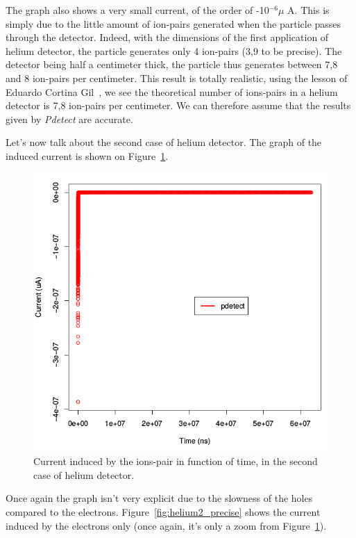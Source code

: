 \documentclass[11pt]{article}
\begin{document}
				The graph also shows a very small current, of the order of -10$^{-6}\mu$ A. This is simply due to the little
				amount of ion-pairs generated when the particle passes through the detector. Indeed, with the dimensions of the
				first application of helium detector, the particle generates only 4 ion-pairs (3,9 to be precise). The detector
				being half a centimeter thick, the particle thus generates between 7,8 and 8 ion-pairs per centimeter.
				This result is totally realistic, using the lesson of Eduardo Cortina Gil~\cite{lphy2236}, we see the theoretical
				number of ions-pairs in a helium detector is 7,8 ion-pairs per centimeter. We can therefore assume that the
				results given by \textit{Pdetect} are accurate.

				Let's now talk about the second case of helium detector. The graph of the induced current is shown on
				Figure~\ref{fig:helium2_unprecise}.

				\begin{figure}[H]
				  \center
				  \includegraphics[scale=0.4]{images/applications/helium2_unprecise.png}
				  \caption{Current induced by the ions-pair in function of time, in the second case of helium detector.}
				  \label{fig:helium2_unprecise}
				\end{figure}

				Once again the graph isn't very explicit due to the slowness of the holes compared to the electrons.
				Figure~\ref{fig:helium2_precise} shows the current induced by the electrons only (once again, it's only
				a zoom from Figure~\ref{fig:helium2_unprecise}).
\end{document}

